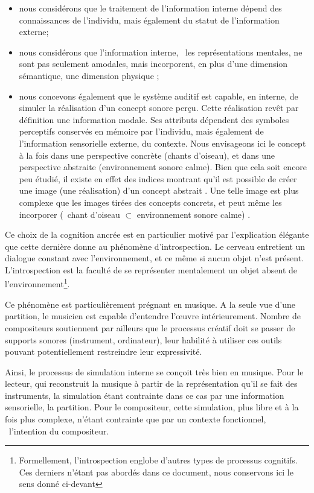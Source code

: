 \begin{itemize}
\item nous considérons que le traitement de l'information interne dépend des connaissances de l'individu, mais également du statut de l'information externe;
\item nous considérons que l'information interne, \ie~les représentations mentales, ne sont pas seulement amodales, mais incorporent, en plus d'une dimension sémantique, une dimension physique \citep{barsalou2008grounded};
\item nous concevons également que le système auditif est capable, en interne, de simuler la réalisation d'un concept sonore perçu. Cette réalisation revêt par définition une information modale. Ses attributs dépendent des symboles perceptifs conservés en mémoire par l'individu, mais également de l'information sensorielle externe, du contexte. Nous envisageons ici le concept à la fois dans une perspective concrète (chants d'oiseau), et dans une perspective abstraite (environnement sonore calme). Bien que cela soit encore peu étudié, il existe en effet des indices montrant qu'il est possible de créer une image (une réalisation) d'un concept abstrait \citep{barsalou2003abstraction,barsalou2005situating}. Une telle image est plus complexe que les images tirées des concepts concrets, et peut même les incorporer (\eg~chant d'oiseau $\subset$ environnement sonore calme) \citep{barsalou2005situating}.
\end{itemize}
 
Ce choix de la cognition ancrée est en particulier motivé par l'explication élégante que cette dernière donne au phénomène d'introspection. Le cerveau entretient un dialogue constant avec l'environnement, et ce même si aucun objet n'est présent. L'introspection est la faculté de se représenter mentalement un objet absent de l'environnement\footnote{Formellement, l'introspection englobe d'autres types de processus cognitifs. Ces derniers n'étant pas abordés dans ce document, nous conservons ici le sens donné ci-devant}.

Ce phénomène est particulièrement prégnant en musique. A la seule vue d'une partition, le musicien est capable d'entendre l'œuvre intérieurement. Nombre de compositeurs soutiennent par ailleurs que le processus créatif doit se passer de supports sonores (instrument, ordinateur), leur habilité à utiliser ces outils pouvant potentiellement restreindre leur expressivité.

Ainsi, le processus de simulation interne se conçoit très bien en musique. Pour le lecteur, qui reconstruit la musique à partir de la représentation qu'il se fait des instruments, la simulation étant contrainte dans ce cas par une information sensorielle, la partition. Pour le compositeur, cette simulation, plus libre et à la fois plus complexe, n'étant contrainte que par un contexte fonctionnel, \ie~l'intention du compositeur.

